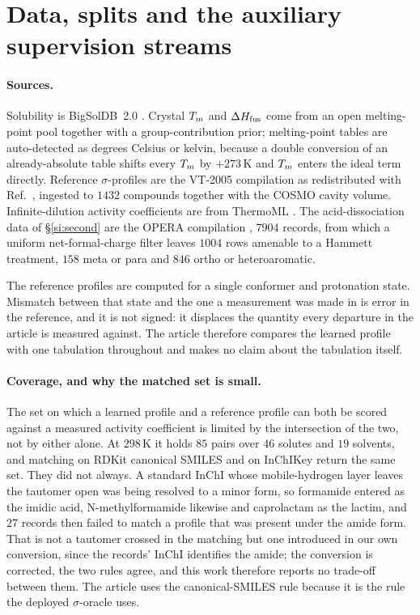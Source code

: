\section{Data, splits and the auxiliary supervision streams}
\label{si:data}

\paragraph{Sources.}
Solubility is BigSolDB~2.0 \cite{krasnov2025bigsoldb}. Crystal $T_m$ and $\Delta H_{\mathrm{fus}}$ come from an open
melting-point pool together with a group-contribution prior; melting-point tables are auto-detected
as degrees Celsius or kelvin, because a double conversion of an already-absolute table shifts every
$T_m$ by $+273$\,K and $T_m$ enters the ideal term directly. Reference $\sigma$-profiles are the
VT-2005 compilation \cite{mullins2006} as redistributed with Ref.~\cite{bell2020cosmosac}, ingested
to $1432$ compounds together with the COSMO cavity volume. Infinite-dilution activity coefficients
are from ThermoML \cite{frenkel2011thermoml}. The acid-dissociation data of \S\ref{si:second} are
the OPERA compilation \cite{mansouri2019opera}, $7904$ records, from which a uniform
net-formal-charge filter leaves $1004$ rows amenable to a Hammett treatment, $158$ meta or para and
$846$ ortho or heteroaromatic.

The reference profiles are computed for a single conformer and protonation state. Mismatch between
that state and the one a measurement was made in is error in the reference, and it is not signed:
it displaces the quantity every departure in the article is measured against. The article therefore
compares the learned profile with one tabulation throughout and makes no claim about the tabulation
itself.

\paragraph{Coverage, and why the matched set is small.}
The set on which a learned profile and a reference profile can both be scored against a measured
activity coefficient is limited by the intersection of the two, not by either alone. At $298$\,K it
holds $85$ pairs over $46$ solutes and $19$ solvents, and matching on RDKit canonical SMILES and on
InChIKey return the same set. They did not always. A standard InChI whose mobile-hydrogen layer
leaves the tautomer open was being resolved to a minor form, so formamide entered as the imidic
acid, N-methylformamide likewise and caprolactam as the lactim, and $27$ records then failed to
match a profile that was present under the amide form. That is not a tautomer crossed in the
matching but one introduced in our own conversion, since the records' InChI identifies the amide;
the conversion is corrected, the two rules agree, and this work therefore reports no trade-off
between them. The article uses the canonical-SMILES rule because it is the rule the deployed
$\sigma$-oracle uses.

